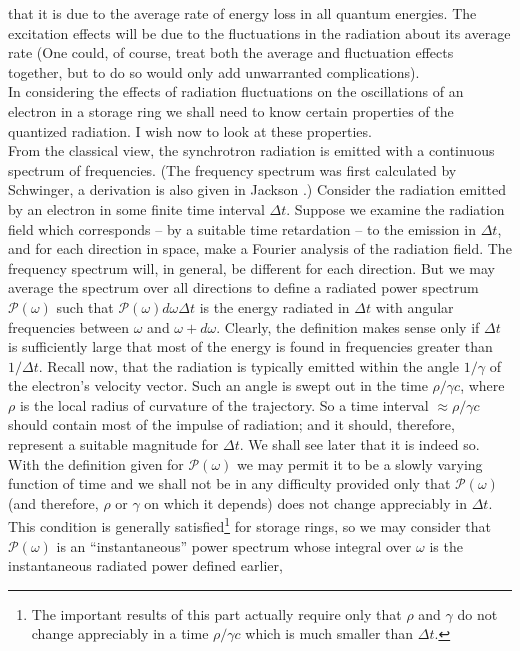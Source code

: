 \documentclass[../sands-adaptation.tex]{subfiles}
\begin{document}
 that it is due to the average rate of energy loss in all quantum energies. The excitation
 effects will be due to the fluctuations in the radiation about its average rate (One could, of
course, treat both the average and fluctuation effects together, but to do so would only add unwarranted complications).\\
In considering the effects of radiation fluctuations on the oscillations of an electron in a storage ring we shall need to know certain properties of the quantized radiation. I wish now to look at these properties.\\
From the classical view, the synchrotron radiation is emitted with a continuous spectrum of frequencies. (The frequency spectrum was first calculated by \cite{13} Schwinger, a derivation
 is also given in Jackson \cite{10}.) Consider the radiation emitted by an electron in some finite time interval $\Delta t$. Suppose we examine the radiation field which corresponds
 -- by a suitable time retardation -- to the emission in $\Delta t$, and for each direction in space, make a Fourier analysis of the radiation field. The frequency spectrum will, in general,
 be different for each direction. But we may average the spectrum over all directions to define a radiated power spectrum $\mathscr{P}(\omega)$ such that $\mathscr{P}(\omega)d\omega \Delta t$ is the energy radiated in $\Delta t$ with angular frequencies between $\omega$ and $\omega + d\omega$. Clearly, the definition makes sense only if $\Delta t$ is sufficiently large that most of the energy is found in frequencies greater than $1/\Delta t$. Recall now, that the radiation
 is typically emitted within the angle $1/\gamma$ of the electron's velocity vector. Such an angle is swept out in the time $\rho/\gamma c$, where $\rho$ is the local radius of curvature
 of the trajectory. So a time interval $\approx \rho/\gamma c$ should contain most of the impulse of radiation; and it should, therefore, represent a suitable magnitude for $\Delta t$. We shall see later that it is indeed so.\\
With the definition given for $\mathscr{P}(\omega)$ we may permit it to be a slowly varying
function of time and we shall not be in any difficulty provided only that $\mathscr{P}(\omega)$
 (and therefore, $\rho$ or $\gamma$ on which it depends) does not change appreciably in $\Delta t$. This condition is generally satisfied\footnote{The important results of this part actually require only that $\rho$ and $\gamma$ do not change appreciably in a time $\rho/\gamma c$ which is much smaller than $\Delta t$.} for storage rings, so we may consider that $\mathscr{P}(\omega)$ is an ``instantaneous'' power spectrum whose integral over $\omega$ is the instantaneous radiated power defined earlier,
\end{document}
